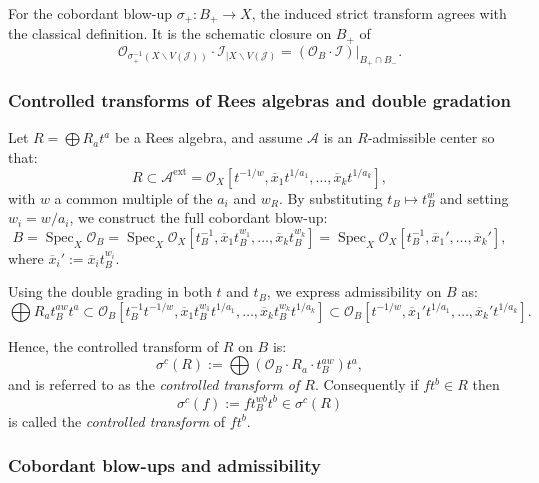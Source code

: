 \documentclass{amsart}
\newcommand{\ext}{{\operatorname{ext}}}
\newcommand{\Spec}{\operatorname{Spec}}
\renewcommand{\setminus}{\smallsetminus}
\begin{document}
\begin{remark}
For the cobordant blow-up \( \sigma_+ : B_+ \to X \), the induced strict transform agrees with the classical definition. It is the schematic closure on \( B_+ \) of
\[
\mathcal{O}_{\sigma_+^{-1}(X \setminus V(\mathcal{J}))} \cdot \mathcal{I}_{|X \setminus V(\mathcal{J})} = (\mathcal{O}_B \cdot \mathcal{I})|_{B_+ \cap B_-}.
\]
\end{remark}

\subsubsection{Controlled transforms of Rees algebras and double gradation}

Let \( R = \bigoplus R_a t^a \) be a Rees algebra, and assume \( \mathcal{A} \) is an \( R \)-admissible center so that:
\[
R \subset \mathcal{A}^\ext = \mathcal{O}_X[t^{-1/w}, \overline{x}_1 t^{1/a_1}, \ldots, \overline{x}_k t^{1/a_k}],
\]
with \( w \) a common multiple of the \( a_i \) and $w_R$. By substituting \( t_B \mapsto t_B^w \) and setting \( w_i = w/a_i \), we construct the full cobordant blow-up:
\[
B = \Spec_X \mathcal{O}_B = \Spec_X \mathcal{O}_X[t_B^{-1}, \overline{x}_1 t_B^{w_1}, \ldots, \overline{x}_k t_B^{w_k}]
= \Spec_X \mathcal{O}_X[t_B^{-1}, \overline{x}_1', \ldots, \overline{x}_k'],
\]
where \( \overline{x}_i' := \overline{x}_i t_B^{w_i} \).

Using the double grading in both \( t \) and \( t_B \), we express admissibility on \( B \) as:
\[
\bigoplus R_a t_B^{aw} t^a
\subset \mathcal{O}_B[t_B^{-1} t^{-1/w}, \overline{x}_1 t_B^{w_1} t^{1/a_1}, \ldots, \overline{x}_k t_B^{w_k} t^{1/a_k}]
\subset \mathcal{O}_B[t^{-1/w}, \overline{x}_1' t^{1/a_1}, \ldots, \overline{x}_k' t^{1/a_k}].
\]

\noindent
Hence, the controlled transform of \( R \) on \( B \) is:
\[
\sigma^c(R) := \bigoplus \left(\mathcal{O}_B \cdot R_a \cdot t_B^{aw} \right)t^a,
\]
and is referred to as the \emph{controlled transform of \( R \)}. Consequently if $ft^b\in R$ then $$\sigma^c(f):=ft_B^{wb}t^b\in \sigma^c(R)$$ is called  the {\it controlled transform} of $ft^b$.

\subsubsection{Cobordant blow-ups and admissibility} \label{control}
\end{document}
